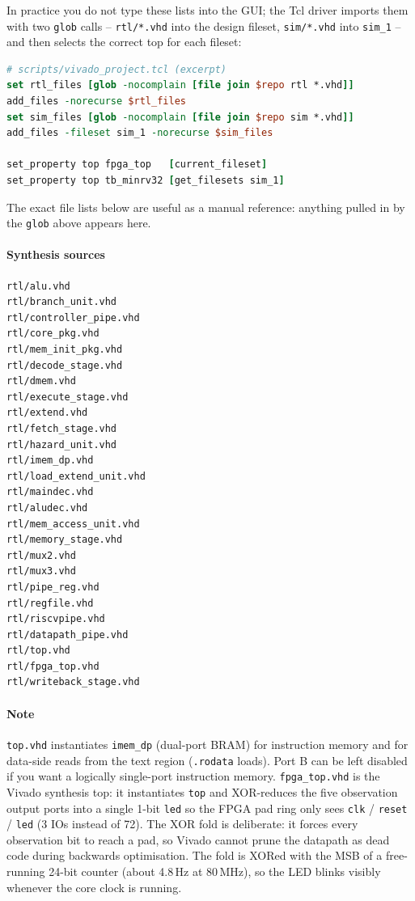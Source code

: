 In practice you do not type these lists into the GUI; the Tcl driver imports
them with two \texttt{glob} calls -- \texttt{rtl/*.vhd} into the design
fileset, \texttt{sim/*.vhd} into \texttt{sim\_1} -- and then selects the
correct top for each fileset:
\begin{lstlisting}[style=minrv,language=tcl]
# scripts/vivado_project.tcl (excerpt)
set rtl_files [glob -nocomplain [file join $repo rtl *.vhd]]
add_files -norecurse $rtl_files
set sim_files [glob -nocomplain [file join $repo sim *.vhd]]
add_files -fileset sim_1 -norecurse $sim_files

set_property top fpga_top   [current_fileset]
set_property top tb_minrv32 [get_filesets sim_1]
\end{lstlisting}
The exact file lists below are useful as a manual reference: anything pulled
in by the \texttt{glob} above appears here.

\paragraph{Synthesis sources}
\begin{lstlisting}[style=minrv]
rtl/alu.vhd
rtl/branch_unit.vhd
rtl/controller_pipe.vhd
rtl/core_pkg.vhd
rtl/mem_init_pkg.vhd
rtl/decode_stage.vhd
rtl/dmem.vhd
rtl/execute_stage.vhd
rtl/extend.vhd
rtl/fetch_stage.vhd
rtl/hazard_unit.vhd
rtl/imem_dp.vhd
rtl/load_extend_unit.vhd
rtl/maindec.vhd
rtl/aludec.vhd
rtl/mem_access_unit.vhd
rtl/memory_stage.vhd
rtl/mux2.vhd
rtl/mux3.vhd
rtl/pipe_reg.vhd
rtl/regfile.vhd
rtl/riscvpipe.vhd
rtl/datapath_pipe.vhd
rtl/top.vhd
rtl/fpga_top.vhd
rtl/writeback_stage.vhd
\end{lstlisting}

\paragraph{Note}
\texttt{top.vhd} instantiates \texttt{imem\_dp} (dual-port BRAM) for instruction
memory and for data-side reads from the text region (\texttt{.rodata} loads).
Port B can be left disabled if you want a logically single-port instruction
memory. \texttt{fpga\_top.vhd} is the Vivado synthesis top: it instantiates
\texttt{top} and XOR-reduces the five observation output ports into a
single 1-bit \texttt{led} so the FPGA pad ring only sees \texttt{clk} /
\texttt{reset} / \texttt{led} (3 IOs instead of 72). The XOR fold is
deliberate: it forces every observation bit to reach a pad, so Vivado
cannot prune the datapath as dead code during backwards optimisation. The
fold is XORed with the MSB of a free-running 24-bit counter (about 4.8\,Hz at
80\,MHz), so the LED blinks visibly whenever the core clock is running.

